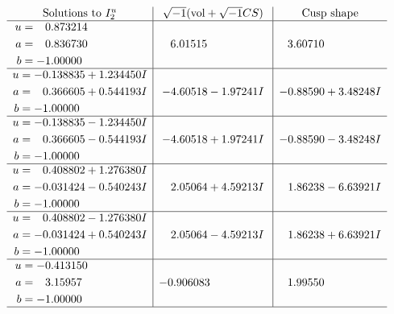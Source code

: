 \documentclass[1p]{elsarticle_modified}
\theoremstyle{definition}
\newcommand{\I}{\sqrt{-1}}
\begin{document}
$$\begin{array}{c|c|c}  
\text{Solutions to }I^u_{2}& \I (\text{vol} + \sqrt{-1}CS) & \text{Cusp shape}\\
 \hline 
\begin{aligned}
u &= \phantom{-}0.873214\phantom{ +0.000000I} \\
a &= \phantom{-}0.836730\phantom{ +0.000000I} \\
b &= -1.00000\phantom{ +0.000000I}\end{aligned}
 & \phantom{-}6.01515\phantom{ +0.000000I} & \phantom{-}3.60710\phantom{ +0.000000I} \\ \hline\begin{aligned}
u &= -0.138835 + 1.234450 I \\
a &= \phantom{-}0.366605 + 0.544193 I \\
b &= -1.00000\phantom{ +0.000000I}\end{aligned}
 & -4.60518 - 1.97241 I & -0.88590 + 3.48248 I \\ \hline\begin{aligned}
u &= -0.138835 - 1.234450 I \\
a &= \phantom{-}0.366605 - 0.544193 I \\
b &= -1.00000\phantom{ +0.000000I}\end{aligned}
 & -4.60518 + 1.97241 I & -0.88590 - 3.48248 I \\ \hline\begin{aligned}
u &= \phantom{-}0.408802 + 1.276380 I \\
a &= -0.031424 - 0.540243 I \\
b &= -1.00000\phantom{ +0.000000I}\end{aligned}
 & \phantom{-}2.05064 + 4.59213 I & \phantom{-}1.86238 - 6.63921 I \\ \hline\begin{aligned}
u &= \phantom{-}0.408802 - 1.276380 I \\
a &= -0.031424 + 0.540243 I \\
b &= -1.00000\phantom{ +0.000000I}\end{aligned}
 & \phantom{-}2.05064 - 4.59213 I & \phantom{-}1.86238 + 6.63921 I \\ \hline\begin{aligned}
u &= -0.413150\phantom{ +0.000000I} \\
a &= \phantom{-}3.15957\phantom{ +0.000000I} \\
b &= -1.00000\phantom{ +0.000000I}\end{aligned}
 & -0.906083\phantom{ +0.000000I} & \phantom{-}1.99550\phantom{ +0.000000I}\\
 \hline 
 \end{array}$$\newpage
\end{document}

